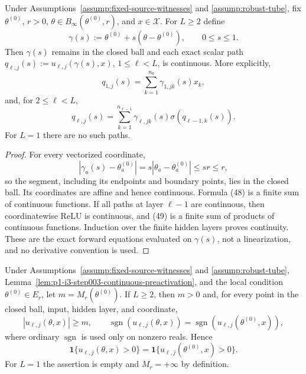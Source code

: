 \begin{lemma}
\label{lem:p1-i3-step003-continuous-preactivation}
Under Assumptions~\ref{assump:fixed-source-witnesses} and
\ref{assump:robust-tube}, fix $\theta^{(0)}$, $r>0$,
$\theta\in B_\infty(\theta^{(0)},r)$, and $x\in\mathcal X$.  For $L\geq2$
define
\[
\gamma(s):=\theta^{(0)}+s(\theta-\theta^{(0)}),
\qquad0\leq s\leq1.
\tag{47}
\]
Then $\gamma(s)$ remains in the closed ball and each exact scalar path
$q_{\ell,j}(s):=u_{\ell,j}(\gamma(s),x)$, $1\leq\ell<L$, is continuous.
More explicitly,
\[
q_{1,j}(s)=\sum_{k=1}^{n_0}\gamma_{1,jk}(s)x_k,
\tag{48}
\]
and, for $2\leq\ell<L$,
\[
q_{\ell,j}(s)=\sum_{k=1}^{n_{\ell-1}}
\gamma_{\ell,jk}(s)\sigma(q_{\ell-1,k}(s)).
\tag{49}
\]
For $L=1$ there are no such paths.
\end{lemma}

\begin{proof}
For every vectorized coordinate,
\[
|\gamma_a(s)-\theta^{(0)}_a|
=s|\theta_a-\theta^{(0)}_a|\leq sr\leq r,
\tag{50}
\]
so the segment, including its endpoints and boundary points, lies in the
closed ball.  Its coordinates are affine and hence continuous.  Formula
(48) is a finite sum of continuous functions.  If all paths at layer
$\ell-1$ are continuous, then coordinatewise ReLU is continuous, and (49) is
a finite sum of products of continuous functions.  Induction over the finite
hidden layers proves continuity.  These are the exact forward equations
evaluated on $\gamma(s)$, not a linearization, and no derivative convention is
used.
\end{proof}

\begin{proposition}
\label{prop:p1-i3-step003-ball-gates}
Under Assumptions~\ref{assump:fixed-source-witnesses} and
\ref{assump:robust-tube}, Lemma~\ref{lem:p1-i3-step003-continuous-preactivation},
and the local condition $\theta^{(0)}\in E_r$, let
$m=M_r(\theta^{(0)})$.  If $L\geq2$, then $m>0$ and, for every point in the
closed ball, input, hidden layer, and coordinate,
\[
|u_{\ell,j}(\theta,x)|\geq m,
\qquad
\operatorname{sgn}(u_{\ell,j}(\theta,x))
=\operatorname{sgn}(u_{\ell,j}(\theta^{(0)},x)),
\tag{51}
\]
where ordinary $\operatorname{sgn}$ is used only on nonzero reals.  Hence
\[
\mathbf1\{u_{\ell,j}(\theta,x)>0\}
=\mathbf1\{u_{\ell,j}(\theta^{(0)},x)>0\}.
\tag{52}
\]
For $L=1$ the assertion is empty and $M_r=+\infty$ by definition.
\end{proposition}

